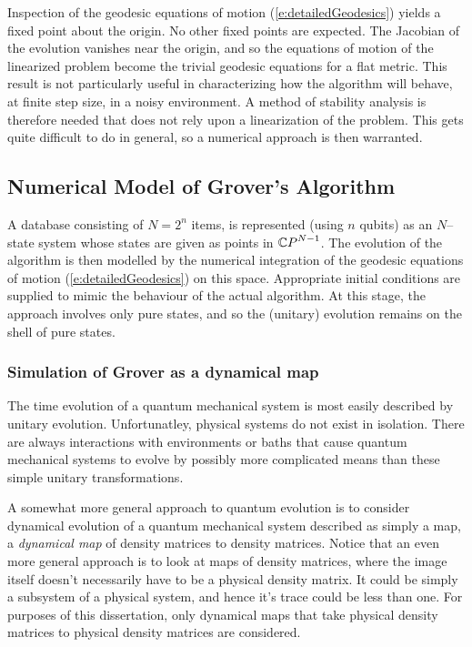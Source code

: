 Inspection of the geodesic equations of motion 
(\ref{e:detailedGeodesics}) yields a fixed point about the 
origin.  No other fixed points are expected. 
The Jacobian of the evolution vanishes near the origin, and
so the equations of motion of the linearized problem become
the trivial geodesic equations for a flat metric.
This result is not particularly useful in characterizing how 
the algorithm will behave, at finite step size, in a noisy 
environment.  
A method of stability analysis
is therefore needed that does not rely upon a linearization
of the problem.  This gets quite difficult to do in general,
so a numerical approach is then warranted.

\subsection{Numerical Model of Grover's Algorithm}

A database consisting of $N=2^n$ items, is represented (using
$n$ qubits) as an $N$--state system whose states are given as
points in ${\mathbb{C} P}^{N-1}$.  The evolution of the algorithm is then 
modelled by the numerical integration of the geodesic equations 
of motion (\ref{e:detailedGeodesics}) on this space.
Appropriate initial conditions are supplied to mimic the behaviour of 
the actual algorithm.  At this stage, the approach involves only pure 
states, and so the (unitary) evolution remains on the shell of pure 
states.

\subsubsection{Simulation of Grover as a dynamical map}

The time evolution of a quantum mechanical system is most easily
described by unitary evolution.
Unfortunatley, physical systems do not exist in isolation.  There
are always interactions with environments or baths that cause
quantum mechanical systems to evolve by possibly more complicated
means than these simple unitary transformations.

A somewhat more general approach to quantum evolution is to 
consider dynamical evolution of a quantum mechanical system
described as simply a map, a \emph{dynamical map}\cite{Sudarshan:??}
of density matrices to density matrices.
Notice that an even more general approach is to look at maps of 
density matrices, where the image itself doesn't necessarily have to
be a physical density matrix.  It could be simply a subsystem
of a physical system, and hence it's trace could be less than
one.  For purposes of this dissertation, only dynamical maps that
take physical density matrices to physical density matrices are
considered.

